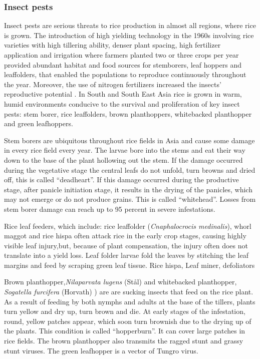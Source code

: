 \subsubsection*{Insect pests}
Insect pests are serious threats to rice production in almost all regions, where rice is grown. The introduction of high yielding technology in the 1960s involving rice varieties with high tillering ability, denser plant spacing, high fertilizer application and irrigation where farmers planted two or three crops per year provided abundant habitat and food sources for stemborers, leaf hoppers and leaffolders, that enabled the populations to reproduce continuously throughout the year. Moreover, the use of nitrogen fertilizers increased the insects' reproductive potential \citep{bottrell2012resurrecting}. In South and South East Asia rice is grown in warm, humid environments conducive to the survival and proliferation of key insect pests: stem borer, rice leaffolders, brown planthoppers, whitebacked planthopper and green leafhoppers.

Stem borers are ubiquitous throughout rice fields in Asia and cause some damage in every rice field every year. The larvae bore into the stems and eat their way down to the base of the plant hollowing out the stem. If the damage occurred during the vegetative stage the central leafs do not unfold, turn browns and dried off, this is called ``deadheart''. If this damage occurred during the productive stage, after panicle initiation stage, it results in the drying of the panicles, which may not emerge or do not produce grains. This is called ``whitehead''. Losses from stem borer damage can reach up to 95 percent in severe infestations. 

Rice leaf feeders, which include: rice leaffolder (\textit{Cnaphalocrocis medinalis}), whorl maggot and rice hispa often attack rice in the early crop stages, causing highly visible leaf injury,but, because of plant compensation, the injury often does not translate into a yield loss. Leaf folder larvae fold the leaves by stitching the leaf margins and feed by scraping green leaf tissue. 
Rice hispa,
Leaf miner, 
defoliators

Brown planthopper,\textit{Nilaparvata lugens} (St\aa l) and whitebacked planthopper, \textit{Sogatella furcifera} (Horvath) ) are are sucking insects that feed on the rice plant.  As a result of feeding by both nymphs and adults at the base of the tillers, plants turn yellow and dry up, turn brown and die. At early stages of the infestation, round, yellow patches appear, which soon turn brownish due to the drying up of the plants. This condition is called ``hopperburn''. It can cover large patches in rice fields. The brown planthopper also transmits the ragged stunt and grassy stunt viruses. The green leafhopper is a vector of Tungro virus.

